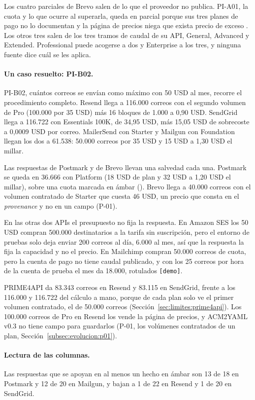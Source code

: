 Los cuatro parciales de Brevo salen de lo que el proveedor no publica.
PI-A01, la cuota y lo que ocurre al superarla, queda en parcial porque sus tres planes de pago no lo documentan y la página de precios niega que exista precio de exceso \citep{brevopricing}.
Los otros tres salen de los tres tramos de caudal de su API, General, Advanced y Extended.
Professional puede acogerse a dos y Enterprise a los tres, y ninguna fuente dice cuál se les aplica.

\paragraph{Un caso resuelto: PI-B02.}
PI-B02, cuántos correos se envían como máximo con 50 USD al mes, recorre el procedimiento completo.
Resend llega a 116.000 correos con el segundo volumen de Pro (100.000 por 35 USD) más 16 bloques de 1.000 a 0,90 USD.
SendGrid llega a 116.722 con Essentials 100K, de 34,95 USD, más 15,05 USD de sobrecoste a 0,0009 USD por correo.
MailerSend con Starter y Mailgun con Foundation llegan los dos a 61.538: 50.000 correos por 35 USD y 15 USD a 1,30 USD el millar.

Las respuestas de Postmark y de Brevo llevan una salvedad cada una.
Postmark se queda en 36.666 con Platform (18 USD de plan y 32 USD a 1,20 USD el millar), sobre una cuota marcada en ámbar (\semambar{}).
Brevo llega a 40.000 correos con el volumen contratado de Starter que cuesta 46 USD, un precio que consta en el \textit{provenance} y no en un campo (P-01).

En las otras dos APIs el presupuesto no fija la respuesta.
En Amazon SES los 50 USD compran 500.000 destinatarios a la tarifa sin suscripción, pero el entorno de pruebas solo deja enviar 200 correos al día, 6.000 al mes, así que la respuesta la fija la capacidad y no el precio.
En Mailchimp compran 50.000 correos de cuota, pero la cuenta de pago no tiene caudal publicado, y con los 25 correos por hora de la cuenta de prueba el mes da 18.000, rotulados \texttt{[demo]}.

PRIME4API da 83.343 correos en Resend y 83.115 en SendGrid, frente a los 116.000 y 116.722 del cálculo a mano, porque de cada plan solo ve el primer volumen contratado, el de 50.000 correos (Sección~\ref{sec:limites:prime4api}).
Los 100.000 correos de Pro en Resend los vende la página de precios, y ACM2YAML v0.3 no tiene campo para guardarlos (P-01, los volúmenes contratados de un plan, Sección~\ref{subsec:evolucion:p01}).

\paragraph{Lectura de las columnas.}
Las respuestas que se apoyan en al menos un hecho en ámbar son 13 de 18 en Postmark y 12 de 20 en Mailgun, y bajan a 1 de 22 en Resend y 1 de 20 en SendGrid.

